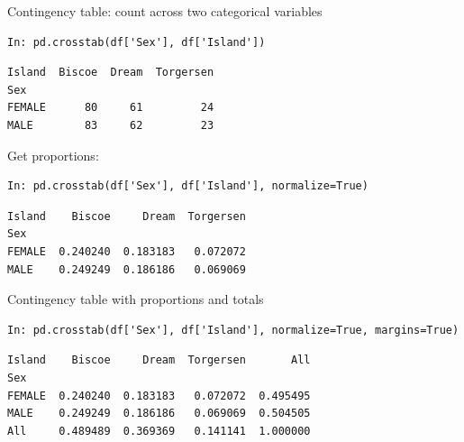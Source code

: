 \documentclass[aspectratio=169,usenames,dvipsnames]{beamer}
\begin{document}
\begin{frame}[fragile]{Contingency table: count across two categorical variables}
\begin{lstlisting}
In: pd.crosstab(df['Sex'], df['Island'])
\end{lstlisting}\vspace{-1em}\begin{lstlisting}[style=plain]
Island  Biscoe  Dream  Torgersen
Sex                             
FEMALE      80     61         24
MALE        83     62         23
\end{lstlisting}

\pause
Get proportions:
\begin{lstlisting}
In: pd.crosstab(df['Sex'], df['Island'], normalize=True)
\end{lstlisting}\vspace{-1em}\begin{lstlisting}[style=plain]
Island    Biscoe     Dream  Torgersen
Sex                                  
FEMALE  0.240240  0.183183   0.072072
MALE    0.249249  0.186186   0.069069
\end{lstlisting}
\end{frame}

\begin{frame}[fragile]{Contingency table with proportions and totals}
\begin{lstlisting}
In: pd.crosstab(df['Sex'], df['Island'], normalize=True, margins=True)
\end{lstlisting}\vspace{-1em}\begin{lstlisting}[style=plain]
Island    Biscoe     Dream  Torgersen       All
Sex                                            
FEMALE  0.240240  0.183183   0.072072  0.495495
MALE    0.249249  0.186186   0.069069  0.504505
All     0.489489  0.369369   0.141141  1.000000
\end{lstlisting}
\end{frame}
\end{document}
